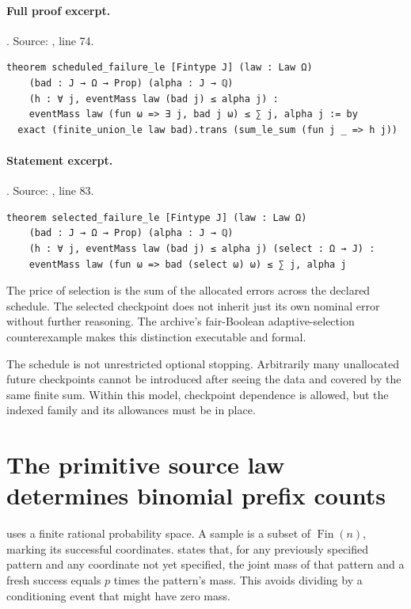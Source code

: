 \documentclass[11pt]{article}
\begin{document}
\paragraph{Full proof excerpt.}. Source: , line 74.
\begin{lstlisting}[style=AVOCSource]
theorem scheduled_failure_le [Fintype J] (law : Law Ω)
    (bad : J → Ω → Prop) (alpha : J → ℚ)
    (h : ∀ j, eventMass law (bad j) ≤ alpha j) :
    eventMass law (fun ω => ∃ j, bad j ω) ≤ ∑ j, alpha j := by
  exact (finite_union_le law bad).trans (sum_le_sum (fun j _ => h j))
\end{lstlisting}

\paragraph{Statement excerpt.}. Source: , line 83.
\begin{lstlisting}[style=AVOCSource]
theorem selected_failure_le [Fintype J] (law : Law Ω)
    (bad : J → Ω → Prop) (alpha : J → ℚ)
    (h : ∀ j, eventMass law (bad j) ≤ alpha j) (select : Ω → J) :
    eventMass law (fun ω => bad (select ω) ω) ≤ ∑ j, alpha j
\end{lstlisting}


The price of selection is the sum of the allocated errors across the declared
schedule. The selected checkpoint does not inherit just its own nominal error
without further reasoning. The archive's fair-Boolean adaptive-selection
counterexample makes this distinction executable and formal.

The schedule is not unrestricted optional stopping. Arbitrarily many
unallocated future checkpoints cannot be introduced after seeing the data
and covered by the same finite sum. Within this model, checkpoint dependence
is allowed, but the indexed family and its allowances must be in place.

\section{The primitive source law determines binomial prefix counts}
 uses a finite rational probability space. A sample is
a subset of $\operatorname{Fin}(n)$, marking its successful coordinates.
 states that, for any previously specified pattern and
any coordinate not yet specified, the joint mass of that pattern and a fresh
success equals $p$ times the pattern's mass. This avoids dividing by a
conditioning event that might have zero mass.
\end{document}
